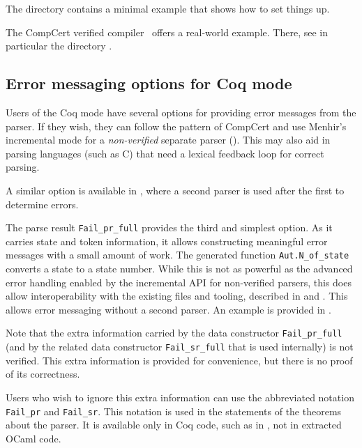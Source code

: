 \documentclass[onecolumn,11pt,nocopyrightspace,preprint]{sigplanconf}
\begin{document}
The directory  contains a minimal example that
shows how to set things up.

The CompCert verified compiler~\cite{compcert,compcert-github} offers a
real-world example. There, see in particular the directory
.

\subsection{Error messaging options for Coq mode}
\label{sec:coq:errmsg}
Users of the Coq mode have several options for providing error messages from the parser.
If they wish, they can follow the pattern of CompCert and use Menhir's incremental mode for
a \textit{non-verified} separate parser (). This may also aid in parsing
languages (such as C) that need a lexical feedback loop for correct parsing.

A similar option is available in , where a second parser is used after the
first to determine errors.

The parse result \verb+Fail_pr_full+ provides the third and simplest option.
As it carries state and token information, it allows constructing meaningful
error messages with a small amount of work. The generated function
\verb+Aut.N_of_state+ converts a state to a state number. While this is not as
powerful as the advanced error handling enabled by the incremental API for
non-verified parsers, this does allow interoperability with the existing
\messages files and tooling, described in  and
. This allows error messaging without a second
parser. An example is provided in .

Note that the extra information carried by the data constructor
\verb+Fail_pr_full+ (and by the related data constructor \verb+Fail_sr_full+
that is used internally) is not verified. This extra information is provided
for convenience, but there is no proof of its correctness.

Users who wish to ignore this extra information can use the abbreviated
notation \verb+Fail_pr+ and \verb+Fail_sr+. This notation is used in the
statements of the theorems about the parser. It is available only in Coq code,
such as in , not in extracted OCaml code.

\end{document}
